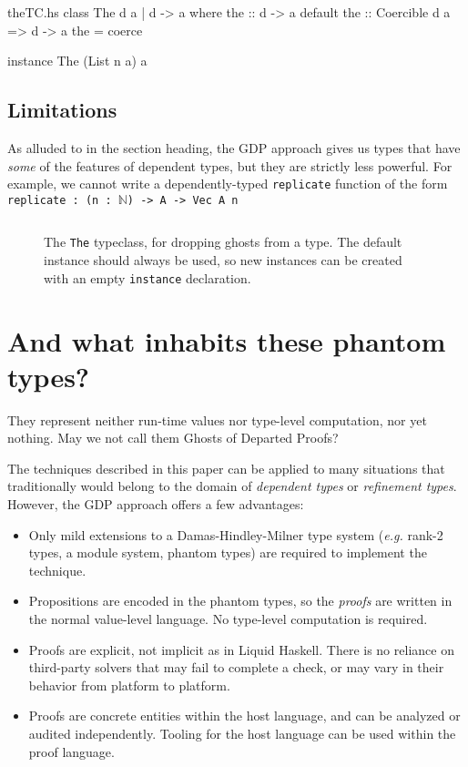 \documentclass[format=sigplan, review=false, screen=true]{acmart}
\begin{document}
\begin{filecontents*}{theTC.hs}
class The d a | d -> a where
    the :: d -> a
    default the :: Coercible d a => d -> a
    the = coerce
    
instance The (List n a) a
\end{filecontents*}

\subsection{Limitations}
As alluded to in the section heading, the GDP approach gives us
types that have \emph{some} of the features of dependent types, but
they are strictly less powerful. For example, we cannot
write a dependently-typed \texttt{replicate} function of the form
\texttt{replicate : (n : $\mathbb{N}$) -> A -> Vec A n}

\begin{figure}
  \inputminted{haskell}{theTC.hs}
  \caption{The \texttt{The} typeclass, for dropping ghosts
    from a type. The default instance should always be used,
    so new instances can be created with an empty
    \texttt{instance} declaration.}
\end{figure}

\section{And what inhabits these phantom types?}
They represent neither run-time values nor type-level computation, nor yet nothing.
May we not call them Ghosts of Departed Proofs?

The techniques described in this paper can be applied to many
situations that traditionally would belong to the domain of
\emph{dependent types} or \emph{refinement types}. However, the
GDP approach offers a few advantages:
\begin{itemize}
\item Only mild extensions to a Damas-Hindley-Milner type system
  ({\it e.g.} rank-2 types, a module system, phantom types) are required to
  implement the technique.
\item Propositions are encoded in the phantom types, so the
  \emph{proofs} are written in the normal value-level language.
  No type-level computation is required.
\item Proofs are explicit, not implicit as in Liquid Haskell. There is
  no reliance on third-party solvers that may fail to complete a check,
  or may vary in their behavior from platform to platform.
\item Proofs are concrete entities within the host language, and can
  be analyzed or audited independently. Tooling for the host language
  can be used within the proof language.
\end{itemize}
\end{document}
